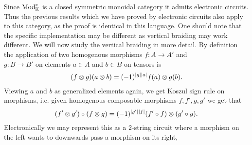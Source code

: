 \documentclass[../thesis.tex]{subfiles}
\begin{document}
            Since $\tt{Mod}_\mathbb{K}^*$ is a closed symmetric monoidal category it admits electronic circuits. Thus the previous results which we have proved by electronic circuits also apply to this category, as the proof is identical in this language. One should note that the specific implementation may be different as vertical braiding may work different. We will now study the vertical braiding in more detail. By definition \cite{Kelly05} the application of two homogenous morphisms $f : A \rightarrow A'$ and \\ $g : B \rightarrow B'$ on elements $a \in A$ and $b\in B$ on tensors is
            \begin{align*}
                (f\otimes g)(a\otimes b) = (-1)^{|g||a|}f(a)\otimes g(b)\tt{.}
            \end{align*}
            Viewing $a$ and $b$ as generalized elements again, we get Koszul sign rule on morphisms, i.e. given homogenous composable morphisms $f,f',g,g'$ we get that
            \begin{align*}
                (f' \otimes g')\circ(f\otimes g) = (-1)^{|g'||f|}(f'\circ f)\otimes (g'\circ g)\tt{.}
            \end{align*}
            Electronically we may represent this as a $2$-string circuit where a morphism on the left wants to downwards pass a morphism on its right,
            \begin{center}
            \end{center}
\end{document}
